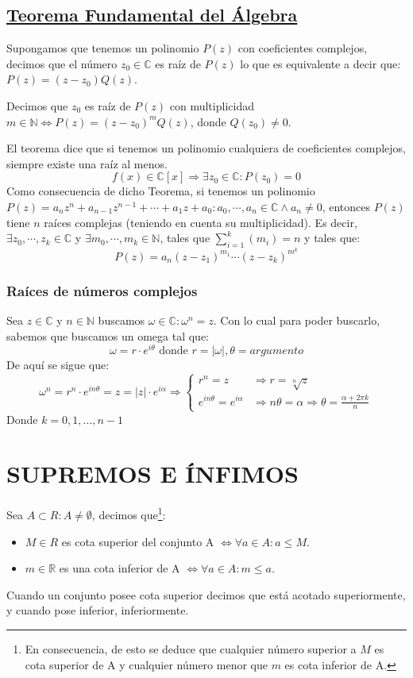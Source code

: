 \documentclass[10pt,a4paper,openright]{book}
\begin{document}
\subsection*{\underline{Teorema Fundamental del Álgebra}}
Supongamos que tenemos un polinomio $P(z)$ con coeficientes complejos, decimos que el número $z_0\in \mathbb C$ es raíz de $P(z)$ lo que es equivalente a decir que: $P(z)=(z-z_0)Q(z)$.\par
Decimos que $z_0$ es raíz de $P(z)$ con multiplicidad $m\in \mathbb N\Leftrightarrow P(z)=(z-z_0)^mQ(z)$, donde $Q(z_0)\neq 0$.\par
El teorema dice que si tenemos un polinomio cualquiera de coeficientes complejos, siempre existe una raíz al menos.
$$f(x)\in \mathbb C[x]\Rightarrow \exists z_0\in \mathbb C: P(z_0)=0$$
Como consecuencia de dicho Teorema, si tenemos un polinomio $P(z)=a_nz^n+a_{n-1}z^{n-1}+\cdots + a_1z+a_0: a_0,\cdots, a_n\in \mathbb C \wedge a_n\neq 0$, entonces $P(z)$ tiene $n$ raíces complejas (teniendo en cuenta su multiplicidad). Es decir, $\exists z_0,\cdots, z_k\in \mathbb C$ y $\exists m_0,\cdots, m_k\in \mathbb N$, tales que $\sum_{i=1}^k(m_i)=n$ y tales que:
$$P(z)=a_n(z-z_1)^{m_1}\cdots (z-z_k)^{m^k}$$

\subsubsection*{Raíces de números complejos}
Sea $z\in \mathbb C$ y $n\in \mathbb N$ buscamos $\omega \in \mathbb C: \omega^n=z$. Con lo cual para poder buscarlo, sabemos que buscamos un omega tal que:
$$\omega=r\cdot e^{i\theta}\mbox{ donde }r=|\omega|, \theta=argumento$$
De aquí se sigue que:
$$\omega^n=r^n\cdot e^{in\theta}=z=|z|\cdot e^{i\alpha}\Rightarrow
\begin{cases}
r^n=z & \Rightarrow r=\sqrt[n]{z} \\
e^{in\theta}=e^{i\alpha} & \Rightarrow n\theta=\alpha\Rightarrow \theta=\frac{\alpha+2\pi k}{n}
\end{cases}
$$
Donde $k=0,1,..., n-1$

\section*{SUPREMOS E ÍNFIMOS}
Sea $A\subset R: A\neq \emptyset$, decimos que\footnote{En consecuencia, de esto se deduce que cualquier número superior a $M$ es cota superior de A y cualquier número menor que $m$ es cota inferior de A.}:
\begin{itemize}
\item $M\in R$ es cota superior del conjunto A $\Leftrightarrow \forall a\in A: a\leq M$.

\item $m\in \mathbb R$ es una cota inferior de A $\Leftrightarrow \forall a\in A: m\leq a$.
\end{itemize}
Cuando un conjunto posee cota superior decimos que está acotado superiormente, y cuando pose inferior, inferiormente.\par
\end{document}
